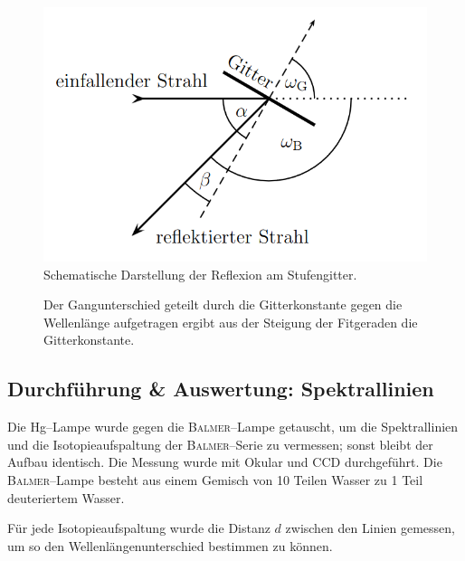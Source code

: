\documentclass[sn-mathphys-num,iicol]{sn-jnl}
\theoremstyle{thmstyleone}
\theoremstyle{thmstyletwo}
\theoremstyle{thmstylethree}
\begin{document}
\begin{figure}[t]
        \centering
        \includegraphics[width=.5\textwidth]{402_reflexion.png}
        \caption{Schematische Darstellung der Reflexion am Stufengitter.\cite{Anleitung402}} \label{fig:strahlengang}
\end{figure}
\begin{figure}[t] 
        \centering
        \resizebox{.5\textwidth}{!}{}
        \caption{Der Gangunterschied geteilt durch die Gitterkonstante gegen die Wellenlänge aufgetragen ergibt aus der Steigung der Fitgeraden die Gitterkonstante.} \label{fig:gitterkonstante}
\end{figure}

\subsection{Durchführung \& Auswertung: Spektrallinien}
Die Hg--Lampe wurde gegen die \textsc{Balmer}--Lampe getauscht, um die Spektrallinien und die Isotopieaufspaltung der \textsc{Balmer}--Serie zu vermessen; sonst bleibt der Aufbau identisch.
Die Messung wurde mit Okular und CCD durchgeführt.
Die \textsc{Balmer}--Lampe besteht aus einem Gemisch von 10 Teilen Wasser zu 1 Teil deuteriertem Wasser.

Für jede Isotopieaufspaltung wurde die Distanz $d$ zwischen den Linien gemessen, um so den Wellenlängenunterschied bestimmen zu können.
\end{document}
